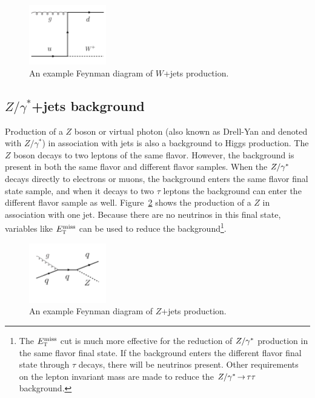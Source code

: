\begin{figure}[h!]
  \centering
  \captionsetup{justification=centering}

  \includegraphics[width=0.3\textwidth]{figures/Feyn_W}
  \caption{An example Feynman diagram of $W$+jets production.}
  \label{fig:Wdiagram}
\end{figure}

\subsection{$Z/\gamma^{*}$+jets background}

Production of a $Z$ boson or virtual photon (also known as Drell-Yan and denoted with $Z/\gamma^{*}$) in association with jets is also a background to Higgs production. The $Z$ boson decays to two leptons of the same flavor. However, the background is present in both the same flavor and different flavor samples. When the $Z/\gamma^{\ast}$ decays directly to electrons or muons, the background enters the same flavor final state sample, and when it decays to two $\tau$ leptons the background can enter the different flavor sample as well. Figure~\ref{fig:Zdiagram} shows the production of a $Z$ in association with one jet. Because there are no neutrinos in this final state, variables like $E_{\textrm{\footnotesize\sc t}}^{\rm miss}$ can be used to reduce the background\footnote{The $E_{\textrm{\footnotesize\sc t}}^{\rm miss}$ cut is much more effective for the reduction of $Z/\gamma^{\ast}$ production in the same flavor final state. If the background enters the different flavor final state through $\tau$ decays, there will be neutrinos present. Other requirements on the lepton invariant mass are made to reduce the $Z/\gamma^{\ast} \,{\rightarrow}\, \tau\tau$ background.}. 

\begin{figure}[h!]
  \centering
  \captionsetup{justification=centering}

  \includegraphics[width=0.3\textwidth]{figures/Feyn_Zjets}
  \caption{An example Feynman diagram of $Z$+jets production.}
  \label{fig:Zdiagram}
\end{figure}

